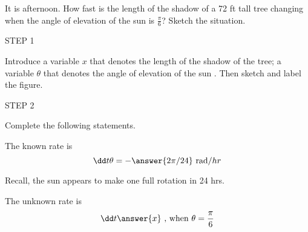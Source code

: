 \documentclass{ximera}
\author{Nela Lakos}
\begin{document}
\begin{exercise}

It is afternoon. How fast is the length of the shadow of a 72 ft tall tree changing when the angle of elevation of the sun is $\frac{\pi}{6}$?  Sketch the situation. 




STEP 1

Introduce a variable $x$ that denotes the length of the shadow of the tree; a variable $\theta$ that denotes the angle of elevation of the sun . Then sketch and label the figure.

\begin{hint}
 \begin{image}
  \end{image}
  \end{hint}
  
  
  
STEP 2

Complete the following statements.

The known rate is
 \[
\dd t \theta= - \answer{2\pi/24} \text{  rad}/hr
\]
\begin{hint}
Recall, the sun appears to make one full rotation in 24 hrs.
\end{hint}
The unknown rate is
\[
\dd t \answer{x} \text{    , when    } \theta=\frac{\pi}{6}
\]




\end{exercise}
\end{document}
